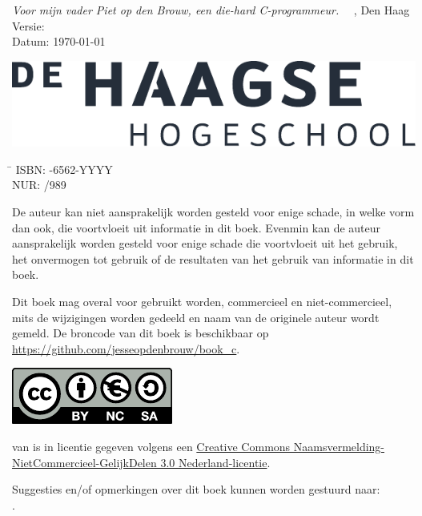 \maketitle

\hspace*{0em}
\vfill
\textsl{Voor mijn vader Piet op den Brouw, een die-hard C-programmeur.}
\vfill
\textcopyright\the\year\ \ \bookauthor, Den Haag\\
Versie: \bookversion\\
Datum: \today

\vspace*{.25cm}
\ifusebookasbook\else
\includegraphics[scale=0.5]{images/HHS_NL_grijs_FC}
\fi

\ifusebookasbook
\vspace*{1cm}
\begin{tabbing}
\hspace{1.2cm}\=\kill
 ISBN: -6562-YYYY \\ 
 NUR:  /989
\end{tabbing}
\fi

\vspace*{1cm}
De auteur kan niet aansprakelijk worden gesteld voor enige schade, in welke vorm dan
ook, die voortvloeit uit informatie in dit boek. Evenmin kan de auteur aansprakelijk
worden gesteld voor enige schade die voortvloeit uit het gebruik, het onvermogen tot
gebruik of de resultaten van het gebruik van informatie in dit boek.

\vspace*{0.5cm}
Dit boek mag overal voor gebruikt worden, commercieel en niet-commercieel, mits de
wijzigingen worden gedeeld en naam van de originele auteur wordt gemeld. De broncode
van dit boek is beschikbaar op \url{https://github.com/jesseopdenbrouw/book_c}.


\vspace*{2cm}
\includegraphics{images/by-nc-sa_eu.pdf}
\par
{\small%
\booktitle{} van \bookauthor{} is in licentie gegeven volgens
een \href{http://creativecommons.org/licenses/by-nc-sa/3.0/nl/}{Creative Commons
Naamsvermelding-NietCommercieel-GelijkDelen 3.0 Nederland-licentie}.

Suggesties en/of opmerkingen over dit boek kunnen worden gestuurd naar:\\
\href{mailto:\email}{\email}.}
